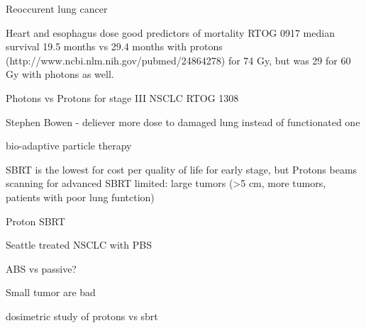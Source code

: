 \documentclass[type=dr, dr=rernat, accentcolor=tud7b,colorbacktitle, bigchapter, openright, twoside, 12pt ]{tudthesis}
\begin{document}
Reoccurent lung cancer %

Heart and esophagus dose good predictors of mortality RTOG 0917 median survival 19.5 months vs 29.4 months with protons (http://www.ncbi.nlm.nih.gov/pubmed/24864278) for 74 Gy, but was 29 for 60 Gy with photons as well.

Photons vs Protons for stage III NSCLC RTOG 1308

Stephen Bowen - deliever more dose to damaged lung instead of functionated one

bio-adaptive particle therapy

SBRT is the lowest for cost per quality of life for early stage, but Protons beams scanning for advanced %
SBRT limited: large tumors (>5 cm, more tumors, patients with poor lung funtction)

Proton SBRT %

Seattle treated NSCLC with PBS

ABS vs passive?

Small tumor are bad %

dosimetric study of protons vs sbrt %


{}
% 
\end{document}
